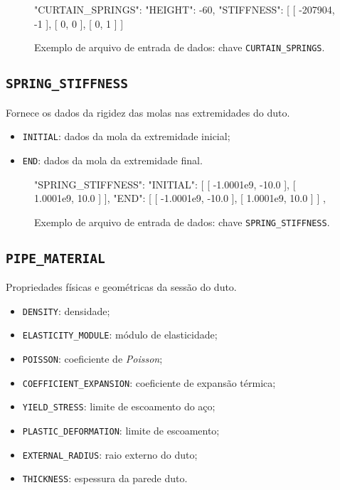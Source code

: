 \begin{figure}
\caption{Exemplo de arquivo de entrada de dados: chave \texttt{CURTAIN\_SPRINGS}.\label{lst:curtain-springs}}
\begin{jsoncode}
{
  "CURTAIN_SPRINGS": {
    "HEIGHT": -60,
    "STIFFNESS": [
      [
        -207904,
        -1
      ],
      [
        0,
        0
      ],
      [
        0,
        1
      ]
    ]
  }
}
\end{jsoncode}
\end{figure}


\subsection{\texttt{SPRING\_STIFFNESS}}

Fornece os dados da rigidez das molas nas extremidades do duto.

\begin{itemize}
  \item \texttt{INITIAL}: dados da mola da extremidade inicial;
  \item \texttt{END}: dados da mola da extremidade final.
\end{itemize}

\begin{figure}
\caption{Exemplo de arquivo de entrada de dados: chave \texttt{SPRING\_STIFFNESS}.\label{lst:spring_stiffness}}
\begin{jsoncode}
{
  "SPRING_STIFFNESS": {
    "INITIAL": [
      [
        -1.0001e9,
        -10.0
      ],
      [
        1.0001e9,
        10.0
      ]
    ],
    "END": [
      [
        -1.0001e9,
        -10.0
      ],
      [
        1.0001e9,
        10.0
      ]
    ]
  },
}
\end{jsoncode}
\end{figure}


\subsection{\texttt{PIPE\_MATERIAL}}

Propriedades físicas e geométricas da sessão do duto.

\begin{itemize}
  \item \texttt{DENSITY}: densidade;
  \item \texttt{ELASTICITY\_MODULE}: módulo de elasticidade;
  \item \texttt{POISSON}: coeficiente de \textit{Poisson};
  \item \texttt{COEFFICIENT\_EXPANSION}: coeficiente de expansão térmica;
  \item \texttt{YIELD\_STRESS}: limite de escoamento do aço;
  \item \texttt{PLASTIC\_DEFORMATION}: limite de escoamento;
  \item \texttt{EXTERNAL\_RADIUS}: raio externo do duto;
  \item \texttt{THICKNESS}: espessura da parede duto.
\end{itemize}

